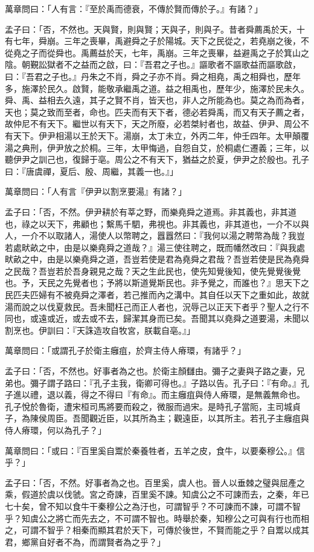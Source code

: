 \begin{pinyinscope}
萬章問曰：「人有言：『至於禹而德衰，不傳於賢而傳於子。』有諸？」

孟子曰：「否，不然也。天與賢，則與賢；天與子，則與子。昔者舜薦禹於天，十有七年，舜崩。三年之喪畢，禹避舜之子於陽城。天下之民從之，若堯崩之後，不從堯之子而從舜也。禹薦益於天，七年，禹崩。三年之喪畢，益避禹之子於箕山之陰。朝覲訟獄者不之益而之啟，曰：『吾君之子也。』謳歌者不謳歌益而謳歌啟，曰：『吾君之子也。』丹朱之不肖，舜之子亦不肖。舜之相堯，禹之相舜也，歷年多，施澤於民久。啟賢，能敬承繼禹之道。益之相禹也，歷年少，施澤於民未久。舜、禹、益相去久遠，其子之賢不肖，皆天也，非人之所能為也。莫之為而為者，天也；莫之致而至者，命也。匹夫而有天下者，德必若舜禹，而又有天子薦之者，故仲尼不有天下。繼世以有天下，天之所廢，必若桀紂者也，故益、伊尹、周公不有天下。伊尹相湯以王於天下。湯崩，太丁未立，外丙二年，仲壬四年。太甲顛覆湯之典刑，伊尹放之於桐。三年，太甲悔過，自怨自艾，於桐處仁遷義；三年，以聽伊尹之訓己也，復歸于亳。周公之不有天下，猶益之於夏，伊尹之於殷也。孔子曰：『唐虞禪，夏后、殷、周繼，其義一也。』」

萬章問曰：「人有言『伊尹以割烹要湯』有諸？」

孟子曰：「否，不然。伊尹耕於有莘之野，而樂堯舜之道焉。非其義也，非其道也，祿之以天下，弗顧也；繫馬千駟，弗視也。非其義也，非其道也，一介不以與人，一介不以取諸人，湯使人以幣聘之，囂囂然曰：『我何以湯之聘幣為哉？我豈若處畎畝之中，由是以樂堯舜之道哉？』湯三使往聘之，既而幡然改曰：『與我處畎畝之中，由是以樂堯舜之道，吾豈若使是君為堯舜之君哉？吾豈若使是民為堯舜之民哉？吾豈若於吾身親見之哉？天之生此民也，使先知覺後知，使先覺覺後覺也。予，天民之先覺者也；予將以斯道覺斯民也。非予覺之，而誰也？』思天下之民匹夫匹婦有不被堯舜之澤者，若己推而內之溝中。其自任以天下之重如此，故就湯而說之以伐夏救民。吾未聞枉己而正人者也，況辱己以正天下者乎？聖人之行不同也，或遠或近，或去或不去，歸潔其身而已矣。吾聞其以堯舜之道要湯，未聞以割烹也。伊訓曰：『天誅造攻自牧宮，朕載自亳。』」

萬章問曰：「或謂孔子於衛主癰疽，於齊主侍人瘠環，有諸乎？」

孟子曰：「否，不然也。好事者為之也。於衛主顏讎由。彌子之妻與子路之妻，兄弟也。彌子謂子路曰：『孔子主我，衛卿可得也。』子路以告。孔子曰：『有命。』孔子進以禮，退以義，得之不得曰『有命』。而主癰疽與侍人瘠環，是無義無命也。孔子悅於魯衛，遭宋桓司馬將要而殺之，微服而過宋。是時孔子當阨，主司城貞子，為陳侯周臣。吾聞觀近臣，以其所為主；觀遠臣，以其所主。若孔子主癰疽與侍人瘠環，何以為孔子？」

萬章問曰：「或曰：『百里奚自鬻於秦養牲者，五羊之皮，食牛，以要秦穆公。』信乎？」

孟子曰：「否，不然。好事者為之也。百里奚，虞人也。晉人以垂棘之璧與屈產之乘，假道於虞以伐虢。宮之奇諫，百里奚不諫。知虞公之不可諫而去，之秦，年已七十矣，曾不知以食牛干秦穆公之為汙也，可謂智乎？不可諫而不諫，可謂不智乎？知虞公之將亡而先去之，不可謂不智也。時舉於秦，知穆公之可與有行也而相之，可謂不智乎？相秦而顯其君於天下，可傳於後世，不賢而能之乎？自鬻以成其君，鄉黨自好者不為，而謂賢者為之乎？」


\end{pinyinscope}